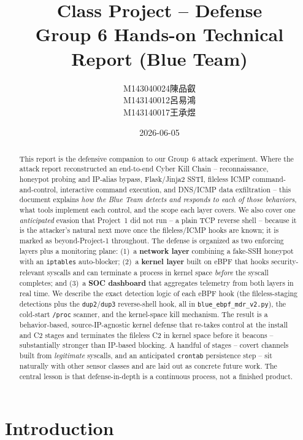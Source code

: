 \documentclass[11pt]{article}
\title{\textbf{Class Project -- Defense}\\[4pt]
       \large Group 6 Hands-on Technical Report (Blue Team)}
\author{%
  M143040024\quad 陳品叡 \\
  M143140012\quad 呂易鴻 \\
  M143140017\quad 王承煜}
\date{2026-06-05}
\newcommand{\co}[1]{\texttt{#1}}
\begin{document}
\maketitle

\begin{abstract}
\noindent
This report is the defensive companion to our Group~6 attack experiment.
Where the attack report reconstructed an end-to-end Cyber Kill Chain --
reconnaissance, honeypot probing and IP-alias bypass, Flask/Jinja2 SSTI,
fileless ICMP command-and-control, interactive command execution, and
DNS/ICMP data exfiltration -- this document explains \emph{how the Blue Team
detects and responds to each of those behaviors}, what tools implement each
control, and the scope each layer covers. We also cover
one \emph{anticipated} evasion that Project~1 did not run -- a plain TCP
reverse shell -- because it is the attacker's natural next move once the
fileless/ICMP hooks are known; it is marked as beyond-Project-1 throughout.
The defense is organized as two enforcing layers plus a monitoring plane:
(1)~a \textbf{network layer} combining a fake-SSH honeypot with an
\co{iptables} auto-blocker; (2)~a \textbf{kernel layer} built on eBPF that
hooks security-relevant syscalls and can terminate a process in kernel
space \emph{before} the syscall completes; and (3)~a \textbf{SOC dashboard}
that aggregates telemetry from both layers in real time.
We describe the exact detection logic of each eBPF hook (the
fileless-staging detections plus the \co{dup2}/\co{dup3} reverse-shell hook,
all in \co{blue\_ebpf\_mdr\_v2.py}), the cold-start
\co{/proc} scanner, and the kernel-space kill mechanism.
The result is a behavior-based, source-IP-agnostic kernel defense that
re-takes control at the install and C2 stages and terminates the fileless C2
in kernel space before it beacons -- substantially stronger than IP-based
blocking. A handful of stages -- covert channels built from \emph{legitimate}
syscalls, and an anticipated \co{crontab} persistence step -- sit naturally
with other sensor classes and are laid out as concrete future work. The
central lesson is that defense-in-depth is a continuous process, not a
finished product.
\end{abstract}

\tableofcontents

\section{Introduction}
\end{document}
